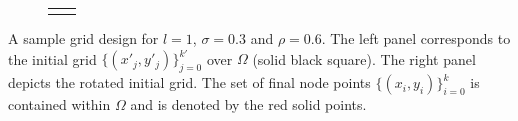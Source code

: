 \documentclass{beamer}
\begin{document}
\begin{frame}
\begin{figure}
\begin{tabular}{cc}
\begin{minipage}{0.4\textwidth}
    \end{minipage}
  \end{tabular}
\end{figure}
A sample grid design for $l=1$, $\sigma=0.3$ and $\rho=0.6$. The left
panel corresponds to the initial grid $\{ (x'_j,y'_j) \}_{j=0}^{k'}$
over $\Omega$ (solid black square). The right panel depicts the
rotated initial grid. The set of final node points
$\{ (x_i,y_i) \}_{i=0}^{k}$ is contained within $\Omega$ and is
denoted by the red solid points.
\end{frame}
\end{document}
